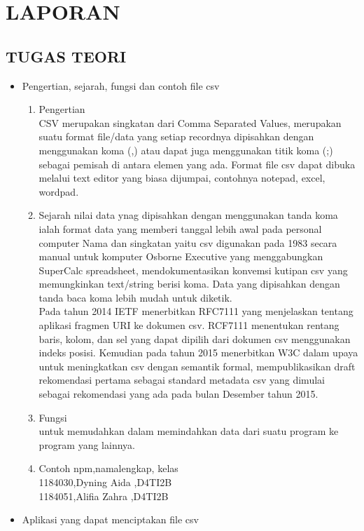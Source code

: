 \chapter{LAPORAN}
\section{TUGAS TEORI}
\begin{itemize}
\item Pengertian, sejarah, fungsi dan contoh file csv
\begin{enumerate}
    \item Pengertian\\
    CSV merupakan singkatan dari Comma Separated Values, merupakan suatu format file/data yang setiap recordnya dipisahkan dengan menggunakan koma (,) atau dapat juga menggunakan titik koma (;) sebagai pemisah di antara elemen yang ada. Format file csv dapat dibuka melalui text editor yang biasa dijumpai, contohnya notepad, excel, wordpad.
    \item Sejarah
    nilai data ynag dipisahkan dengan menggunakan tanda koma ialah format data yang memberi tanggal lebih awal pada personal computer
    Nama dan singkatan yaitu csv digunakan pada 1983 secara manual untuk komputer Osborne Executive yang menggabungkan SuperCalc spreadsheet, mendokumentasikan konvemsi kutipan csv yang memungkinkan text/string berisi koma. Data yang dipisahkan dengan tanda baca koma lebih mudah untuk diketik.\\
    Pada tahun 2014 IETF menerbitkan RFC7111 yang menjelaskan tentang aplikasi fragmen URI ke dokumen csv. RCF7111 menentukan rentang baris, kolom, dan sel yang dapat dipilih dari dokumen csv menggunakan indeks posisi. Kemudian pada tahun 2015 menerbitkan W3C dalam upaya untuk meningkatkan csv dengan semantik formal, mempublikasikan draft rekomendasi pertama sebagai standard metadata csv yang dimulai sebagai rekomendasi yang ada pada bulan Desember tahun 2015.
    \item Fungsi\\
    untuk memudahkan dalam memindahkan data dari suatu program ke program yang lainnya.
    \item Contoh
     npm,namalengkap, kelas\\
     1184030,Dyning Aida ,D4TI2B\\
     1184051,Alifia Zahra ,D4TI2B\\ 
\end{enumerate}
\item Aplikasi yang dapat menciptakan file csv\\

\end{itemize}
